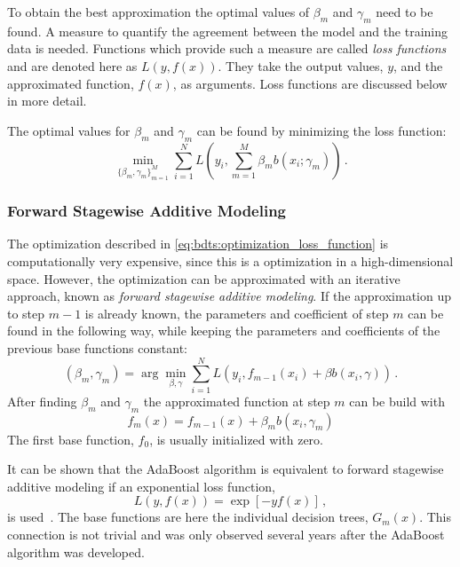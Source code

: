 To obtain the best approximation the optimal values of $\beta_m$ and $\gamma_m$ need to be found.
A measure to quantify the agreement between the model and the training data is needed.
Functions which provide such a measure are called \emph{loss functions} and are denoted here as $L(y, f(x))$.
They take the output values, $y$, and the approximated function, $f(x)$, as arguments.
Loss functions are discussed below in more detail.

The optimal values for $\beta_m$ and $\gamma_m$ can be found by minimizing the loss function:
\begin{equation}
    \label{eq:bdts:optimization_loss_function}
    \min_{{\{\beta_m, \gamma_m\}}_{m=1}^M} \sum_{i=1}^{N} L \left( y_i, \sum_{m=1}^{M} \beta_m b(x_i; \gamma_m) \right) \,.
\end{equation}

\subsubsection{Forward Stagewise Additive Modeling}\label{subsub:bdt:boosting:forward_modeling}

The optimization described in \cref{eq:bdts:optimization_loss_function} is computationally very expensive, since
this is a optimization in a high-dimensional space.
However, the optimization can be approximated with an iterative approach, known as \emph{forward stagewise additive modeling}.
If the approximation up to step $m-1$ is already known, the parameters and coefficient of step $m$ can be found
in the following way, while keeping the parameters and coefficients of the previous base functions constant:
\begin{equation}
    (\beta_m, \gamma_m) = \arg \min_{\beta, \gamma} \sum_{i=1}^N L(y_i, f_{m-1}(x_i) + \beta b(x_i, \gamma)) \,.
\end{equation}
After finding $\beta_m$ and $\gamma_m$ the approximated function at step $m$ can be build with
\begin{equation}
    f_m(x) = f_{m-1}(x) + \beta_m b(x_i, \gamma_m)
\end{equation}
The first base function, $f_0$, is usually initialized with zero.

It can be shown that the AdaBoost algorithm is equivalent to forward stagewise additive modeling if an exponential
loss function,
\begin{equation}
    L(y, f(x)) = \exp \left[ - y f(x) \right] \,,
\end{equation}
is used~\cite{Hastie2009}.
The base functions are here the individual decision trees, $G_m(x)$.
This connection is not trivial and was only observed several years after the AdaBoost algorithm was
developed.

